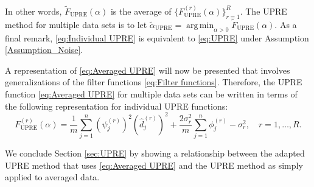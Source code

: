 \documentclass[12pt]{article}
\newcommand{\mA}{m}	%
\newcommand{\dft}[1]{\widehat{#1}}	%
\newcommand{\regparam}{\alpha}  %
\DeclareMathOperator*{\argmin}{arg\,min}
\newcommand{\filt}{\phi}
\newcommand{\mfilt}{\psi}
\newcommand{\noiseSD}{\sigma}	%
\newcommand{\U}{F_{\text{UPRE}}}	%
\newcommand{\UBig}{\widetilde{F}_{\text{UPRE}}}	%
\begin{document}
\noindent In other words, $\UBig(\regparam)$ is the average of $\{\U^{(r)}(\regparam)\}_{r=1}^R$. The UPRE method for multiple data sets is to let $\widetilde{\regparam}_{\textrm{UPRE}} = \argmin_{\regparam > 0} \UBig(\regparam)$. As a final remark, \eqref{eq:Individual UPRE} is equivalent to \eqref{eq:UPRE} under Assumption \ref{Assumption_Noise}. \par
A representation of \eqref{eq:Averaged UPRE} will now be presented that involves generalizations of the filter functions \eqref{eq:Filter functions}. 
Therefore, the UPRE function \eqref{eq:Averaged UPRE} for multiple data sets can be written in terms of the following representation for individual UPRE functions:
\begin{equation}
\label{eq:Individual UPRE 2}
\U^{(r)}(\regparam) = \frac{1}{\mA} \sum_{j=1}^{n} \left(\mfilt^{(r)}_j\right)^2\left(\dft{d}_j^{(r)}\right)^2 + \frac{2\noiseSD^2_r}{\mA} \sum_{j=1}^{n} \filt^{(r)}_j - \noiseSD^2_r, \quad r = 1,\ldots,R.
\end{equation}

We conclude Section \ref{sec:UPRE} by showing a relationship between the adapted UPRE method that uses \eqref{eq:Averaged UPRE} and the UPRE method as simply applied to averaged data.
\end{document}
